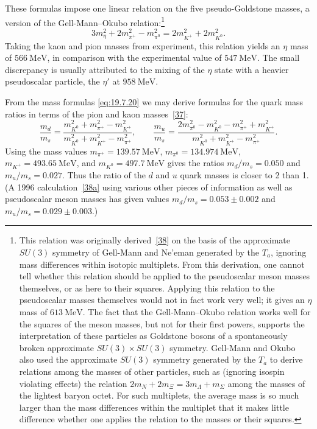 These formulas impose one linear relation on the five pseudo-Goldstone masses, a version of the Gell-Mann--Okubo relation:\footnote{This relation was originally derived~\hyperref[ch19-ref-38]{[38]} on the basis of the approximate $SU(3)$ symmetry of Gell-Mann and Ne'eman generated by the $T_a$, ignoring mass differences within isotopic multiplets. From this derivation, one cannot tell whether this relation should be applied to the pseudoscalar meson masses themselves, or as here to their squares. Applying this relation to the pseudoscalar masses themselves would not in fact work very well; it gives an $\eta$ mass of $613\ \mathrm{MeV}$. The fact that the Gell-Mann--Okubo relation works well for the squares of the meson masses, but not for their first powers, supports the interpretation of these particles as Goldstone bosons of a spontaneously broken approximate $SU(3)\times SU(3)$ symmetry. Gell-Mann and Okubo also used the approximate $SU(3)$ symmetry generated by the $T_a$ to derive relations among the masses of other particles, such as (ignoring isospin violating effects) the relation $2m_N+2m_\Xi=3m_\Lambda+m_\Sigma$ among the masses of the lightest baryon octet. For such multiplets, the average mass is so much larger than the mass differences within the multiplet that it makes little difference whether one applies the relation to the masses or their squares.}
\begin{equation}
3m_\eta^2+2m_{\pi^+}^2-m_{\pi^0}^2
=2m_{K^+}^2+2m_{K^0}^2.
\tag{19.7.21}\label{eq:19.7.21}
\end{equation}
Taking the kaon and pion masses from experiment, this relation yields an $\eta$ mass of $566\ \mathrm{MeV}$, in comparison with the experimental value of $547\ \mathrm{MeV}$. The small discrepancy is usually attributed to the mixing of the $\eta$ state with a heavier pseudoscalar particle, the $\eta'$ at $958\ \mathrm{MeV}$.

From the mass formulas \eqref{eq:19.7.20} we may derive formulas for the quark mass ratios in terms of the pion and kaon masses~\hyperref[ch19-ref-37]{[37]}:
\begin{equation}
\frac{m_d}{m_s}
=\frac{m_{K^0}^2+m_{\pi^+}^2-m_{K^+}^2}
{m_{K^0}^2+m_{K^+}^2-m_{\pi^+}^2},
\qquad
\frac{m_u}{m_s}
=\frac{2m_{\pi^0}^2-m_{K^0}^2-m_{\pi^+}^2+m_{K^+}^2}
{m_{K^0}^2+m_{K^+}^2-m_{\pi^+}^2}.
\tag{19.7.22}\label{eq:19.7.22}
\end{equation}
Using the mass values $m_{\pi^+}=139.57\ \mathrm{MeV}$, $m_{\pi^0}=134.974\ \mathrm{MeV}$, $m_{K^+}=493.65\ \mathrm{MeV}$, and $m_{K^0}=497.7\ \mathrm{MeV}$ gives the ratios $m_d/m_s=0.050$ and $m_u/m_s=0.027$. Thus the ratio of the $d$ and $u$ quark masses is closer to 2 than 1. (A 1996 calculation~\hyperref[ch19-ref-38a]{[38a]} using various other pieces of information as well as pseudoscalar meson masses has given values $m_d/m_s=0.053\pm0.002$ and $m_u/m_s=0.029\pm0.003$.)

